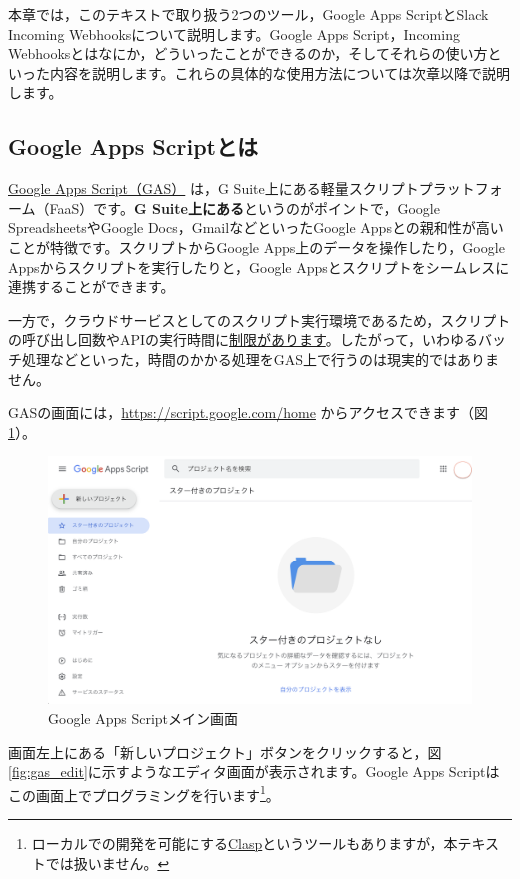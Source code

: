 \documentclass[uplatex,a4j]{jsarticle}
\begin{document}
本章では，このテキストで取り扱う2つのツール，Google Apps ScriptとSlack Incoming Webhooksについて説明します。Google Apps Script，Incoming Webhooksとはなにか，どういったことができるのか，そしてそれらの使い方といった内容を説明します。これらの具体的な使用方法については次章以降で説明します。

\subsection{Google Apps Scriptとは}
\label{subsec:About GAS}

\href{https://developers.google.com/apps-script/}{Google Apps Script（GAS）} は，G Suite上にある軽量スクリプトプラットフォーム（FaaS）です。\textbf{G Suite上にある}というのがポイントで，Google SpreadsheetsやGoogle Docs，GmailなどといったGoogle Appsとの親和性が高いことが特徴です。スクリプトからGoogle Apps上のデータを操作したり，Google Appsからスクリプトを実行したりと，Google Appsとスクリプトをシームレスに連携することができます。

一方で，クラウドサービスとしてのスクリプト実行環境であるため，スクリプトの呼び出し回数やAPIの実行時間に\href{https://developers.google.com/apps-script/guides/services/quotas}{制限があります}。したがって，いわゆるバッチ処理などといった，時間のかかる処理をGAS上で行うのは現実的ではありません。


GASの画面には，\href{https://script.google.com/home}{https://script.google.com/home} からアクセスできます（図\ref{fig:gas_main}）。
\begin{figure}[H]
 \centering
 \includegraphics[keepaspectratio, scale=0.4]{images/gas_main.png}
 \caption{Google Apps Scriptメイン画面}
 \label{fig:gas_main}
\end{figure}

画面左上にある「新しいプロジェクト」ボタンをクリックすると，図\ref{fig:gas_edit}に示すようなエディタ画面が表示されます。Google Apps Scriptはこの画面上でプログラミングを行います\footnote{ローカルでの開発を可能にする\href{https://github.com/google/clasp}{Clasp}というツールもありますが，本テキストでは扱いません。}。
\end{document}
